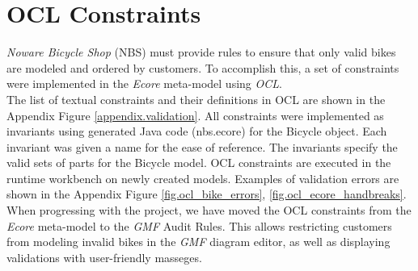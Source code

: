 \section{OCL Constraints}
\label{sec.ocl_constraints}

\noindent 
\emph{Noware Bicycle Shop} (NBS) must provide rules to ensure that
only valid bikes are modeled and ordered by customers. To accomplish this, a 
set of constraints were implemented in the \emph{Ecore} meta-model using \emph{OCL}.\\

\noindent
The list of textual constraints and their definitions in OCL are
shown in the Appendix Figure \ref{appendix.validation}. All constraints were implemented as invariants using
generated Java code (nbs.ecore) for the Bicycle object. Each invariant was given
a name for the ease of reference. The invariants specify the valid sets
of parts for the Bicycle model. OCL constraints are executed in the runtime
workbench on newly created models. Examples of validation errors are shown in the Appendix Figure
\ref{fig.ocl_bike_errors}, \ref{fig.ocl_ecore_handbreaks}.\\

\noindent 
When progressing with the project, we have moved the OCL constraints from the
\emph{Ecore} meta-model to the \emph{GMF} Audit Rules. This allows
restricting customers from modeling invalid bikes in the \emph{GMF} diagram
editor, as well as displaying validations with user-friendly
masseges.\\


